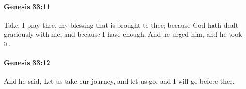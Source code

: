 		\paragraph{Genesis 33:11} %
			\label{GENESIS-33-11}

			Take, I pray thee, my blessing that is brought to thee; because God hath dealt graciously with me, and because I have enough. And he urged him, and he took it.


		\paragraph{Genesis 33:12} %
			\label{GENESIS-33-12}

			And he said, Let us take our journey, and let us go, and I will go before thee.


